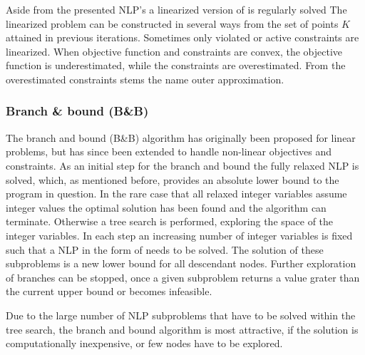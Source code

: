    Aside from the presented NLP's a linearized version of  is regularly solved
    The linearized problem can be constructed in several ways from the set of points $K$ attained in previous iterations.
    Sometimes only violated or active constraints are linearized. When objective function and constraints are convex, the
    objective function is underestimated, while the constraints are overestimated. From the overestimated constraints stems
    the name outer approximation.

        \subsubsection{Branch \& bound (B\&B)}
        The branch and bound (B\&B) algorithm has originally been proposed for linear problems, but has since been extended to
        handle non-linear objectives and constraints. As an initial step for the branch and bound the fully relaxed
        NLP  is solved, which, as mentioned before, provides an absolute lower bound to
        the program in question. In the rare case that all relaxed integer variables assume integer values the optimal
        solution has been found and the algorithm can terminate. Otherwise a tree search is performed, exploring the
        space of the integer variables. In each step an increasing number of integer variables is fixed such that
        a NLP in the form of  needs to be solved. The solution of these subproblems is
        a new lower bound for all descendant nodes. Further exploration of branches can be stopped, once a
        given subproblem returns a value grater than the current upper bound or becomes infeasible.

        Due to the large number of NLP subproblems that have to be solved within the tree search, the branch and bound
        algorithm is most attractive, if the solution is computationally inexpensive, or few nodes have to be explored.

